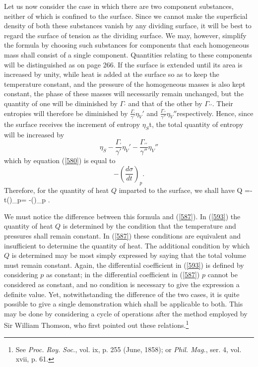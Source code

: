 \documentclass[12pt]{article}
\begin{document}
{Let us now consider the case in which there are two component substances, neither of which is confined to the surface. Since we cannot make the superficial density of both these substances vanish by any dividing surface, it will be best to regard the surface of tension as the dividing surface. We may, however, simplify the formula by choosing such substances for components that each homogeneous mass shall consist of a single component. Quantities relating to these components will be distinguished as on page 266. If the surface is extended until its area is increased by unity, while heat is added at the surface so as to keep the temperature constant, and the pressure of the homogeneous masses is also kept constant, the phase of these masses will necessarily remain unchanged, but the quantity of one will be diminished by $\Gamma_\prime$ and that of the other by $\Gamma_{\prime\prime}$. Their entropies will therefore be diminished by $\frac{\Gamma_\prime}{\gamma'}\eta_V'$  and $\frac{\Gamma_{\prime\prime}}{\gamma''}\eta_V''$respectively. Hence, since the surface receives the increment of entropy $\eta_S$t, the total quantity of entropy will be increased by
$$\eta_S - \frac{\Gamma_\prime}{\gamma'}\eta_V'- \frac{\Gamma_{\prime\prime}}{\gamma''}\eta_V''$$
which by equation (\ref{580}) is equal to
$$-\left(\frac{d\sigma}{dt}\right)_p.$$
Therefore, for the quantity of heat $Q$ imparted to the surface, we shall have
\eqs Q =-t\left(\right)_p= -\left(\right)_p . \label{593} \eqe

We must notice the difference between this formula and (\ref{587}). In (\ref{593}) the quantity of heat $Q$ is determined by the condition that the temperature and pressures shall remain constant. In (\ref{587}) these conditions are equivalent and insufficient to determine the quantity of heat. The additional condition by which $Q$ is determined may be most simply expressed by saying that the total volume must remain constant. Again, the differential coefficient in (\ref{593}) is defined by considering $p$ as constant; in the differential coefficient in (\ref{587}) $p$ cannot be considered as constant, and no condition is necessary to give the expression a definite value. Yet, notwithstanding the difference of the two cases, it is quite possible to give a single demonstration which shall be applicable to both. This may be done by considering a cycle of operations after the method employed by Sir William Thomson, who first pointed out these relations.\footnote{See \textit{Proc. Roy. Soc.}, vol. ix, p. 255 (June, 1858); or \textit{Phil. Mag.}, ser. 4, vol. xvii, p. 61.}

}
\end{document}
